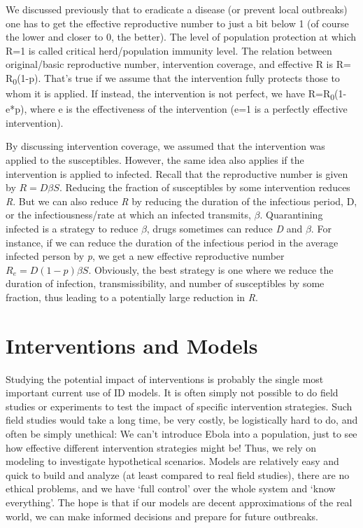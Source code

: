 \documentclass[
]{book}
\begin{document}
We discussed previously that to eradicate a disease (or prevent local outbreaks) one has to get the effective reproductive number to just a bit below 1 (of course the lower and closer to 0, the better). The level of population protection at which R=1 is called critical herd/population immunity level. The relation between original/basic reproductive number, intervention coverage, and effective R is R= R\textsubscript{0}(1-p). That's true if we assume that the intervention fully protects those to whom it is applied. If instead, the intervention is not perfect, we have R=R\textsubscript{0}(1-e*p), where e is the effectiveness of the intervention (e=1 is a perfectly effective intervention).

By discussing intervention coverage, we assumed that the intervention was applied to the susceptibles. However, the same idea also applies if the intervention is applied to infected. Recall that the reproductive number is given by \(R = D \beta S\). Reducing the fraction of susceptibles by some intervention reduces \emph{R}. But we can also reduce \emph{R} by reducing the duration of the infectious period, D, or the infectiousness/rate at which an infected transmits, \(\beta\). Quarantining infected is a strategy to reduce \(\beta\), drugs sometimes can reduce \emph{D} and \(\beta\). For instance, if we can reduce the duration of the infectious period in the average infected person by \emph{p}, we get a new effective reproductive number \(R_{e} = D(1-p) \beta S\). Obviously, the best strategy is one where we reduce the duration of infection, transmissibility, and number of susceptibles by some fraction, thus leading to a potentially large reduction in \emph{R}.

\hypertarget{interventions-and-models}{%
\section{Interventions and Models}\label{interventions-and-models}}

Studying the potential impact of interventions is probably the single most important current use of ID models. It is often simply not possible to do field studies or experiments to test the impact of specific intervention strategies. Such field studies would take a long time, be very costly, be logistically hard to do, and often be simply unethical: We can't introduce Ebola into a population, just to see how effective different intervention strategies might be! Thus, we rely on modeling to investigate hypothetical scenarios. Models are relatively easy and quick to build and analyze (at least compared to real field studies), there are no ethical problems, and we have `full control' over the whole system and `know everything'. The hope is that if our models are decent approximations of the real world, we can make informed decisions and prepare for future outbreaks.
\end{document}
